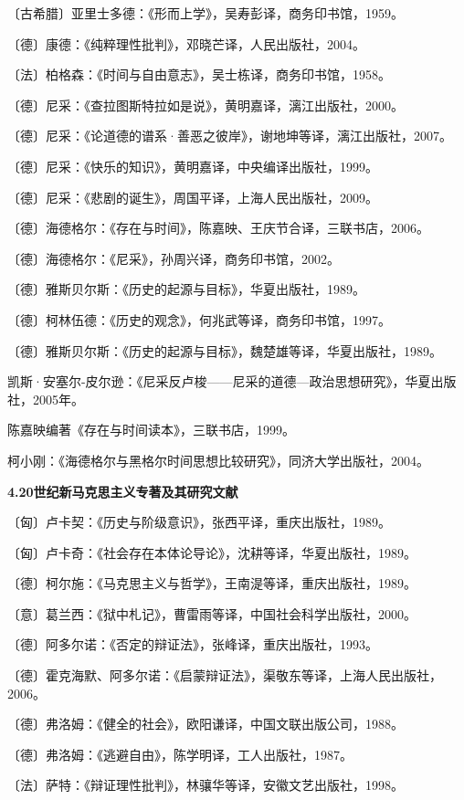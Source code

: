 \documentclass[UTF8, fontset = sourcesans, a4paper, oneside, zihao =
-4, scheme=chinese, no-math, space=true]{ctexbook}
\begin{document}
〔古希腊〕亚里士多德：《形而上学》，吴寿彭译，商务印书馆，1959。

〔德〕康德：《纯粹理性批判》，邓晓芒译，人民出版社，2004。

〔法〕柏格森：《时间与自由意志》，吴士栋译，商务印书馆，1958。

〔德〕尼采：《查拉图斯特拉如是说》，黄明嘉译，漓江出版社，2000。

〔德〕尼采：《论道德的谱系·善恶之彼岸》，谢地坤等译，漓江出版社，2007。

〔德〕尼采：《快乐的知识》，黄明嘉译，中央编译出版社，1999。

〔德〕尼采：《悲剧的诞生》，周国平译，上海人民出版社，2009。

〔德〕海德格尔：《存在与时间》，陈嘉映、王庆节合译，三联书店，2006。

〔德〕海德格尔：《尼采》，孙周兴译，商务印书馆，2002。

〔德〕雅斯贝尔斯：《历史的起源与目标》，华夏出版社，1989。

〔德〕柯林伍德：《历史的观念》，何兆武等译，商务印书馆，1997。

〔德〕雅斯贝尔斯：《历史的起源与目标》，魏楚雄等译，华夏出版社，1989。

凯斯·安塞尔-皮尔逊：《尼采反卢梭------尼采的道德---政治思想研究》，华夏出版社，2005年。

陈嘉映编著《存在与时间读本》，三联书店，1999。

柯小刚：《海德格尔与黑格尔时间思想比较研究》，同济大学出版社，2004。

\textbf{4.20世纪新马克思主义专著及其研究文献}

〔匈〕卢卡契：《历史与阶级意识》，张西平译，重庆出版社，1989。

〔匈〕卢卡奇：《社会存在本体论导论》，沈耕等译，华夏出版社，1989。

〔德〕柯尔施：《马克思主义与哲学》，王南湜等译，重庆出版社，1989。

〔意〕葛兰西：《狱中札记》，曹雷雨等译，中国社会科学出版社，2000。

〔德〕阿多尔诺：《否定的辩证法》，张峰译，重庆出版社，1993。

〔德〕霍克海默、阿多尔诺：《启蒙辩证法》，渠敬东等译，上海人民出版社，2006。

〔德〕弗洛姆：《健全的社会》，欧阳谦译，中国文联出版公司，1988。

〔德〕弗洛姆：《逃避自由》，陈学明译，工人出版社，1987。

〔法〕萨特：《辩证理性批判》，林骧华等译，安徽文艺出版社，1998。
\end{document}
